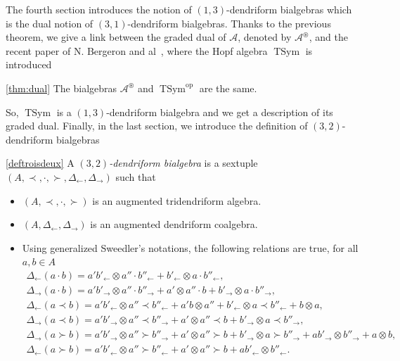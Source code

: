 \documentclass[pdftex]{sigma}
\makeatletter
\numberwithin{equation}{section}
\theoremstyle{definition}
\theoremstyle{plain}
\newcommand{\mathcenter}{\@fleqnfalse}
\DeclareMathOperator{\op}{op}
\DeclareMathOperator{\TSym}{TSym}
\makeatother
\begin{document}
 The fourth section introduces the notion of $(1,3)$-dendriform bialgebras which is the dual notion of $(3,1)$-dendriform bialgebras. Thanks to the previous theorem, we give a link between the graded dual of $\mathcal{A}$, denoted by $\mathcal{A}^{\circledast}$, and the recent paper of N. Bergeron and al~\cite{Eclair}, where the Hopf algebra $\TSym$ is introduced
\begin{customthm}{\ref{thm:dual}}
	The bialgebras $\mathcal{A}^{\circledast}$ and $\TSym^{\op}$ are the same.
\end{customthm}
So, $\TSym$ is a $(1,3)$-dendriform bialgebra and we get a description of its graded dual.
Finally, in the last section, we introduce the definition of $(3,2)$-dendriform bialgebras
 \begin{customdefi}{\ref{deftroisdeux}}\samepage
	A \emph{$(3,2)$-dendriform bialgebra} is a sextuple $(A,\prec,\cdot,\succ,\Delta_{\leftarrow},\Delta_{\rightarrow})$ such that
	\begin{itemize}\itemsep=0pt
		\item $(A,\prec,\cdot,\succ)$ is an augmented tridendriform algebra.
		\item $(A,\Delta_{\leftarrow},\Delta_{\rightarrow})$ is an augmented dendriform coalgebra.
		\item Using generalized Sweedler's notations, the following relations are true, for all $a,b\in A$
		\begin{gather*}
			\Delta_{\leftarrow}(a\cdot b) =a'b'_{\leftarrow}\otimes a''\cdot b''_{\leftarrow}+b'_{\leftarrow}\otimes a\cdot b''_{\leftarrow},\\
			\Delta_{\rightarrow}(a\cdot b) =a'b'_{\rightarrow}\otimes a''\cdot b''_{\rightarrow}+a'\otimes a''\cdot b+b'_{\rightarrow}\otimes a\cdot b''_{\rightarrow}, \\
			\Delta_{\leftarrow}(a\prec b) =a'b'_{\leftarrow}\otimes a''\prec b''_{\leftarrow}+a'b\otimes a'' +b'_{\leftarrow}\otimes a\prec b''_{\leftarrow}+b\otimes a,\\
			\Delta_{\rightarrow}(a\prec b) =a'b'_{\rightarrow}\otimes a''\prec b''_{\rightarrow}+a'\otimes a''\prec b +b'_{\rightarrow}\otimes a\prec b''_{\rightarrow},\\
			\Delta_{\rightarrow}(a\succ b) =a'b'_{\rightarrow}\otimes a''\succ b''_{\rightarrow}+a'\otimes a''\succ b +b'_{\rightarrow}\otimes a\succ b''_{\rightarrow}+ab'_{\rightarrow}\otimes b''_{\rightarrow}+a\otimes b, \\
			\Delta_{\leftarrow}(a\succ b) =a'b'_{\leftarrow}\otimes a''\succ b''_{\leftarrow}+a'\otimes a''\succ b +ab'_{\leftarrow}\otimes b''_{\leftarrow}.
		\end{gather*}\mathcenter
	\end{itemize}
\end{customdefi}
\end{document}
